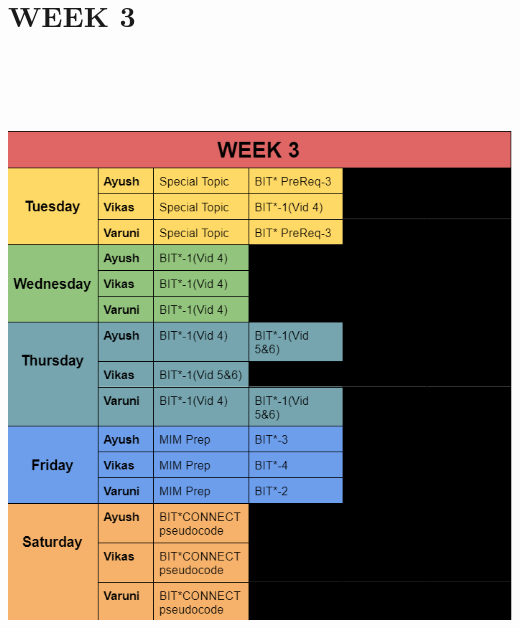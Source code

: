 \documentclass[12pt]{report}
\begin{document}
\section{WEEK 3}
\includegraphics[height=17cm,width = 15cm]{week3.png}
\end{document}
